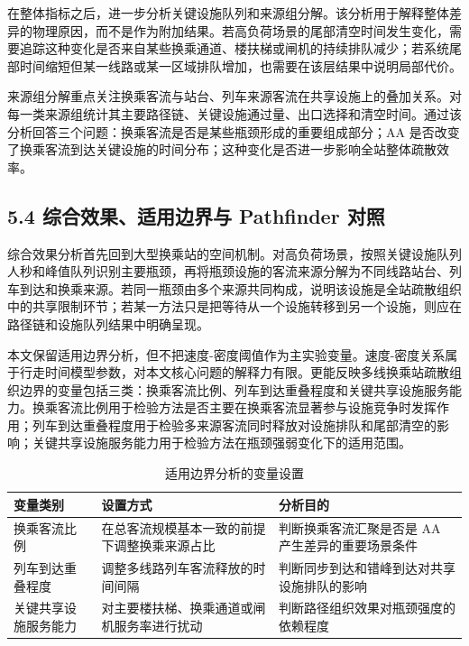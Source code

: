 \documentclass[UTF8,a4paper,12pt]{ctexart}
\begin{document}
在整体指标之后，进一步分析关键设施队列和来源组分解。该分析用于解释整体差异的物理原因，而不是作为附加结果。若高负荷场景的尾部清空时间发生变化，需要追踪这种变化是否来自某些换乘通道、楼扶梯或闸机的持续排队减少；若系统尾部时间缩短但某一线路或某一区域排队增加，也需要在该层结果中说明局部代价。

来源组分解重点关注换乘客流与站台、列车来源客流在共享设施上的叠加关系。对每一类来源组统计其主要路径链、关键设施通过量、出口选择和清空时间。通过该分析回答三个问题：换乘客流是否是某些瓶颈形成的重要组成部分；AA 是否改变了换乘客流到达关键设施的时间分布；这种变化是否进一步影响全站整体疏散效率。

\subsection{5.4 综合效果、适用边界与 Pathfinder 对照}

综合效果分析首先回到大型换乘站的空间机制。对高负荷场景，按照关键设施队列人秒和峰值队列识别主要瓶颈，再将瓶颈设施的客流来源分解为不同线路站台、列车到达和换乘来源。若同一瓶颈由多个来源共同构成，说明该设施是全站疏散组织中的共享限制环节；若某一方法只是把等待从一个设施转移到另一个设施，则应在路径链和设施队列结果中明确呈现。

本文保留适用边界分析，但不把速度-密度阈值作为主实验变量。速度-密度关系属于行走时间模型参数，对本文核心问题的解释力有限。更能反映多线换乘站疏散组织边界的变量包括三类：换乘客流比例、列车到达重叠程度和关键共享设施服务能力。换乘客流比例用于检验方法是否主要在换乘客流显著参与设施竞争时发挥作用；列车到达重叠程度用于检验多来源客流同时释放对设施排队和尾部清空的影响；关键共享设施服务能力用于检验方法在瓶颈强弱变化下的适用范围。

\begin{table}[htbp]
\centering
\caption{适用边界分析的变量设置}
\small
\begin{tabular}{p{}p{}p{}}
\toprule
变量类别 & 设置方式 & 分析目的 \\
\midrule
换乘客流比例 & 在总客流规模基本一致的前提下调整换乘来源占比 & 判断换乘客流汇聚是否是 AA 产生差异的重要场景条件 \\
列车到达重叠程度 & 调整多线路列车客流释放的时间间隔 & 判断同步到达和错峰到达对共享设施排队的影响 \\
关键共享设施服务能力 & 对主要楼扶梯、换乘通道或闸机服务率进行扰动 & 判断路径组织效果对瓶颈强度的依赖程度 \\
\bottomrule
\end{tabular}
\end{table}
\end{document}
